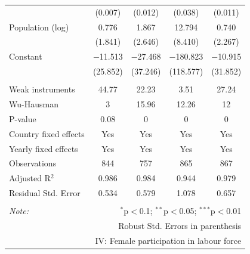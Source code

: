 \documentclass[10pt,letterpaper]{article}
\begin{document}
\begin{table}[!htbp]
\begin{tabular}{@{\extracolsep{1pt}}lcccc}
  & (0.007) & (0.012) & (0.038) & (0.011) \\ 
  Population (log) & 0.776 & 1.867 & 12.794 & 0.740 \\ 
  & (1.841) & (2.646) & (8.410) & (2.267) \\ 
  Constant & $-$11.513 & $-$27.468 & $-$180.823 & $-$10.915 \\ 
  & (25.852) & (37.246) & (118.577) & (31.852) \\ 
 \hline \\[-1.8ex] 
Weak instruments & 44.77 & 22.23 & 3.51 & 27.24 \\ 
Wu-Hausman & 3 & 15.96 & 12.26 & 12 \\ 
P-value & 0.08 & 0 & 0 & 0 \\ 
Country fixed effects & Yes & Yes & Yes & Yes \\ 
Yearly fixed effects & Yes & Yes & Yes & Yes \\ 
Observations & 844 & 757 & 865 & 867 \\ 
Adjusted R$^{2}$ & 0.986 & 0.984 & 0.944 & 0.979 \\ 
Residual Std. Error & 0.534 & 0.579 & 1.078 & 0.657 \\ 
\hline 
\hline \\[-1.8ex] 
\textit{Note:}  & \multicolumn{4}{r}{$^{*}$p$<$0.1; $^{**}$p$<$0.05; $^{***}$p$<$0.01} \\ 
 & \multicolumn{4}{r}{Robust Std. Errors in parenthesis} \\ 
 & \multicolumn{4}{r}{IV: Female participation in labour force} \\ 
\end{tabular} 
\end{table}
\end{document}
